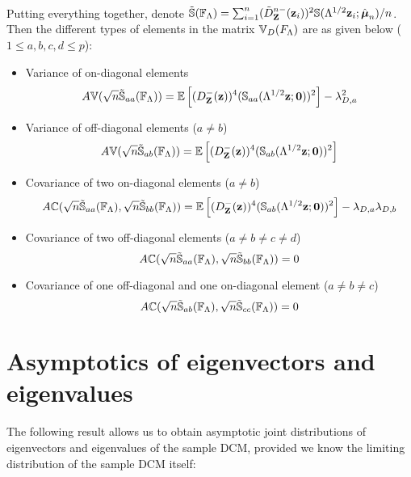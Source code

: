 \paragraph{}Putting everything together, denote $ \tilde {{\mathbb{S}}}({\mathbb{F}}_\Lambda) = \sum_{i=1}^n (\tilde D^{n-}_{\mathbf{Z}} ({\bf{z}}_i))^2 {\mathbb{S}} (\Lambda^{1/2}{\bf{z}}_i; \hat {{\boldsymbol{\mu}}}_n)/n $. Then the different types of elements in the matrix ${\mathbb{V}}_D(F_\Lambda)$ are as given below ($1 \leq a,b,c,d \leq p$):

\begin{itemize}
\item Variance of on-diagonal elements
%
$$
A{\mathbb{V}}( \sqrt n \tilde {{\mathbb{S}}}_{aa}({\mathbb{F}}_\Lambda)) = {\mathbb{E}} \left[ (D^-_{\mathbf{Z}} ({\bf{z}}))^4 ({\mathbb{S}}_{aa} (\Lambda^{1/2} {\bf{z}}; {\bf 0}))^2 \right] - \lambda_{D,a}^2
$$

\item Variance of off-diagonal elements ($a \neq b$)
%
$$
A{\mathbb{V}}( \sqrt n \tilde {{\mathbb{S}}}_{ab}({\mathbb{F}}_\Lambda)) = {\mathbb{E}} \left[ (D^-_{\mathbf{Z}} ({\bf{z}}))^4 ({\mathbb{S}}_{ab} (\Lambda^{1/2} {\bf{z}}; {\bf 0}))^2 \right]
$$

\item Covariance of two on-diagonal elements ($a \neq b$)
%
$$
A{\mathbb{C}}( \sqrt n \tilde {{\mathbb{S}}}_{aa}({\mathbb{F}}_\Lambda), \sqrt n \tilde {{\mathbb{S}}}_{bb}({\mathbb{F}}_\Lambda)) =
{\mathbb{E}} \left[ (D^-_{\mathbf{Z}} ({\bf{z}}))^4 ({\mathbb{S}}_{ab} (\Lambda^{1/2} {\bf{z}}; {\bf 0}))^2 \right] - \lambda_{D,a} \lambda_{D,b}
$$

\item Covariance of two off-diagonal elements ($a \neq b \neq c \neq d$)
%
$$
A{\mathbb{C}}( \sqrt n \tilde {{\mathbb{S}}}_{aa}({\mathbb{F}}_\Lambda), \sqrt n \tilde {{\mathbb{S}}}_{bb}({\mathbb{F}}_\Lambda)) = 0
$$

\item Covariance of one off-diagonal and one on-diagonal element ($a \neq b \neq c$)
%
$$
A{\mathbb{C}}( \sqrt n \tilde {{\mathbb{S}}}_{ab}({\mathbb{F}}_\Lambda), \sqrt n \tilde {{\mathbb{S}}}_{cc}({\mathbb{F}}_\Lambda)) = 0
$$
%
\end{itemize}

\section{Asymptotics of eigenvectors and eigenvalues}\label{section:appB}
The following result allows us to obtain asymptotic joint distributions of eigenvectors and eigenvalues of the sample DCM, provided we know the limiting distribution of the sample DCM itself:

